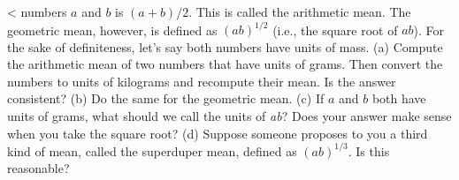  <%
numbers $a$ and $b$ is $(a+b)/2$. This is called the
arithmetic mean. The geometric mean, however, is defined as
$(ab)^{1/2}$ (i.e., the square root of $ab$). For the sake of definiteness, let's say both
numbers have units of mass. (a) Compute the arithmetic mean
of two numbers that have units of grams. Then convert the
numbers to units of kilograms and recompute their mean. Is
the answer consistent? (b) Do the same for the geometric
mean. (c) If $a$ and $b$ both have units of grams, what
should we call the units of \emph{ab}? Does your answer make
sense when you take the square root? (d) Suppose someone
proposes to you a third kind of mean, called the superduper
mean, defined as $(ab)^{1/3}$. Is this reasonable?

